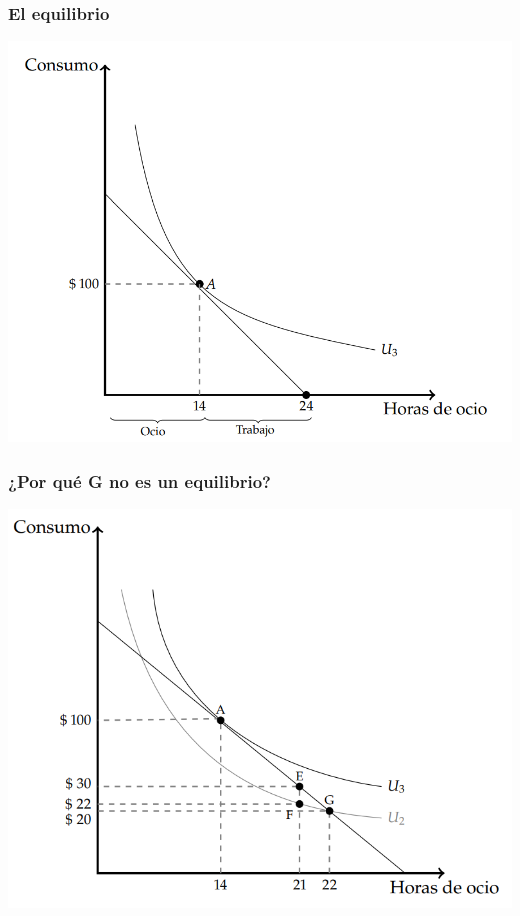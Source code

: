 \documentclass{beamer}
\begin{document}
\begin{frame}
\frametitle{El equilibrio}
\begin{center}
\includegraphics[scale=0.6]{../Figures/C9.4.png}
\end{center}
\end{frame}


\begin{frame}
\frametitle{¿Por qué G no es un equilibrio?}
\begin{center}
  \includegraphics[scale=0.6]{../Figures/C9.6.png}
\end{center}
\end{frame}







\end{document}

